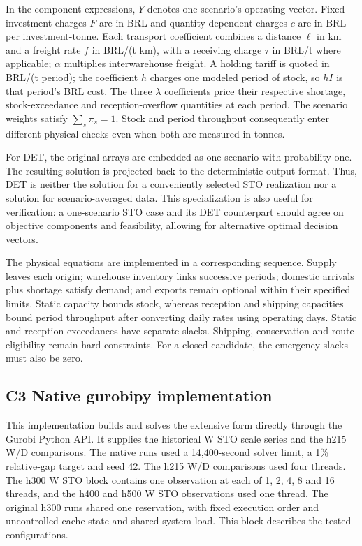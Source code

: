 \documentclass[
  english,
  11pt,
  a4paper,
]{article}
\begin{document}
In the component expressions, \(Y\) denotes one scenario's operating
vector. Fixed investment charges \(F\) are in BRL and quantity-dependent
charges \(c\) are in BRL per investment-tonne. Each transport
coefficient combines a distance \(\ell\) in km and a freight rate \(f\)
in BRL/(t km), with a receiving charge \(\tau\) in BRL/t where
applicable; \(\alpha\) multiplies interwarehouse freight. A holding
tariff is quoted in BRL/(t period); the coefficient \(h\) charges one
modeled period of stock, so \(hI\) is that period's BRL cost. The three
\(\lambda\) coefficients price their respective shortage,
stock-exceedance and reception-overflow quantities at each period. The
scenario weights satisfy \(\sum_s\pi_s=1\). Stock and period throughput
consequently enter different physical checks even when both are measured
in tonnes.

For DET, the original arrays are embedded as one scenario with
probability one. The resulting solution is projected back to the
deterministic output format. Thus, DET is neither the solution for a
conveniently selected STO realization nor a solution for
scenario-averaged data. This specialization is also useful for
verification: a one-scenario STO case and its DET counterpart should
agree on objective components and feasibility, allowing for alternative
optimal decision vectors.

The physical equations are implemented in a corresponding sequence.
Supply leaves each origin; warehouse inventory links successive periods;
domestic arrivals plus shortage satisfy demand; and exports remain
optional within their specified limits. Static capacity bounds stock,
whereas reception and shipping capacities bound period throughput after
converting daily rates using operating days. Static and reception
exceedances have separate slacks. Shipping, conservation and route
eligibility remain hard constraints. For a closed candidate, the
emergency slacks must also be zero.

\subsection{C3 Native gurobipy
implementation}\label{c3-native-gurobipy-implementation}

This implementation builds and solves the extensive form directly
through the Gurobi Python API. It supplies the historical W STO scale
series and the h215 W/D comparisons. The native runs used a
14,400-second solver limit, a 1\% relative-gap target and seed 42. The
h215 W/D comparisons used four threads. The h300 W STO block contains
one observation at each of 1, 2, 4, 8 and 16 threads, and the h400 and
h500 W STO observations used one thread. The original h300 runs shared
one reservation, with fixed execution order and uncontrolled cache state
and shared-system load. This block describes the tested configurations.
\end{document}
